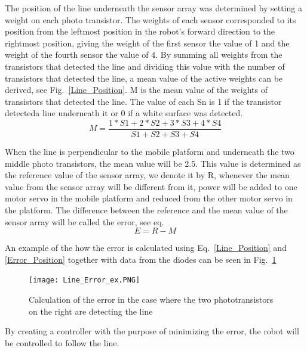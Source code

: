 The position of the line underneath the sensor array was determined by setting a weight on each photo transistor. The weights of each sensor corresponded to its position from the leftmost position in the robot's forward direction to the rightmost position, giving the weight of the first sensor the value of 1 and the weight of the fourth sensor the value of 4. By summing all weights from the transistors that detected the line and dividing this value with the number of transistors that detected the line, a mean value of the active weights can be derived, see Fig.~\ref{Line_Position}. M is the mean value of the weights of transistors that detected the line. The value of each Sn is 1 if the transistor detecteda line underneath it or 0 if a white surface was detected.
\begin{equation}
    M=\frac{1*S1+2*S2+3*S3+4*S4}{S1+S2+S3+S4}
    \label{Line_Position} 
\end{equation}

When the line is perpendicular to the mobile platform and underneath the two middle photo transistors, the mean value will be 2.5. This value is determined as the reference value of the sensor array, we denote it by R, whenever the mean value from the sensor array will be different from it, power will be added to one motor servo in the mobile platform and reduced from the other motor servo in the platform. The difference between the reference and the mean value of the sensor array will be called the error, see eq.
\begin{equation}
    E=R-M
    \label{Error_Position} 
\end{equation}

An example of the how the error is calculated using Eq.~\eq\ref{Line_Position} and \ref{Error_Position} together with data from the diodes can be seen in Fig.~\ref{Line_Error_ex}

\begin{figure}[H]
    \centering
    \texttt{[image: Line\_Error\_ex.PNG]}
    \caption{Calculation of the error in the case where the two phototransistors on the right are detecting the line}
    \label{Line_Error_ex}
\end{figure}


By creating a controller with the purpose of minimizing the error, the robot will be controlled to follow the line.

